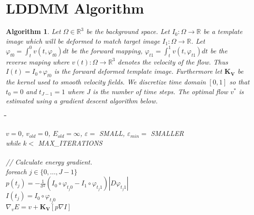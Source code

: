 \documentclass[a4paper,12pt]{article}
\newtheorem{algorithm}{Algorithm}
\newenvironment{listing}
{
  \ttfamily 		%
  \begin{tabbing} 	%
  \hspace*{1cm}\=\hspace*{1cm}\=\hspace*{1cm}\=\hspace*{1cm}\=\hspace*{1cm}\= \kill %
}
{
  \end{tabbing}
}
\begin{document}
\section{LDDMM Algorithm}

\begin{algorithm}
 Let $\Omega \in \mathbb{R}^3$ be the background space.
 Let $I_0 : \Omega \rightarrow \mathbb{R}$ be a template image which will be deformed to match target image $I_1 : \Omega \rightarrow \mathbb{R}$.
 Let $\varphi_{t 0} = \int_{t}^0 v(t, \varphi_{t 0}) dt$ be the forward mapping, $\varphi_{t 1} = \int_{t}^1 v(t, \varphi_{t 1}) dt$ be the reverse maping where $v(t) : \Omega \rightarrow \mathbb{R}^3$ denotes the velocity of the flow.
 Thus $I(t) = I_0 \circ \varphi_{t 0}$ is the forward deformed template image.
 Furthermore let $\bm{K_V}$ be the kernel used to smooth velocity fields.
 We discretize time domain $[0,1]$ so that $t_0 = 0$ and $t_{J-1} = 1$ where $J$ is the number of time steps.
 The optimal flow $v^*$ is estimated using a \emph{gradient descent} algorithm below.
 
 \begin{listing}

  $v = 0$, $v_{old} = 0$, $E_{old} = \infty$, $\varepsilon =$ SMALL, $\varepsilon_{min} =$ SMALLER \\
  while $k <$ MAX\_ITERATIONS \\
  \\
  \> // Calculate energy gradient. \\
  \> foreach $j \in \{0,\ldots,J-1\}$ \\
  \>\>$p(t_j) = -\frac{1}{\sigma^2} \left( I_0\circ\varphi_{t_j 0} - I_1 \circ \varphi_{t_j 1} \right) |D\varphi_{t_j 1}|$ \\
  \>\>$I(t_j) = I_0 \circ \varphi_{t_j 0}$\\
  \>$\nabla_v E = v + \bm{K_V}[p\nabla I]$\\
  \\


\end{listing}
\end{algorithm}
\end{document}
